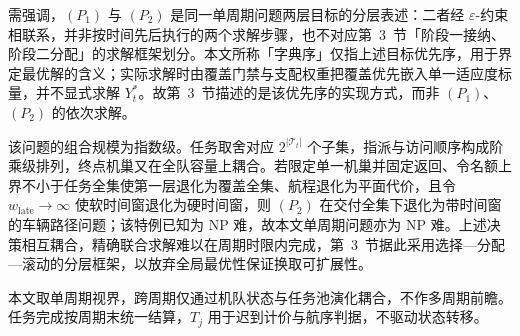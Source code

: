 需强调，$(P_1)$ 与 $(P_2)$ 是同一单周期问题两层目标的分层表述：二者经 $\varepsilon$-约束相联系，并非按时间先后执行的两个求解步骤，也不对应第~3~节「阶段一接纳、阶段二分配」的求解框架划分。本文所称「字典序」仅指上述目标优先序，用于界定最优解的含义；实际求解时由覆盖门禁与支配权重把覆盖优先嵌入单一适应度标量，并不显式求解 $Y_t^*$。故第~3~节描述的是该优先序的实现方式，而非 $(P_1)$、$(P_2)$ 的依次求解。

该问题的组合规模为指数级。任务取舍对应 $2^{|\mathcal{T}_t|}$ 个子集，指派与访问顺序构成阶乘级排列，终点机巢又在全队容量上耦合。若限定单一机巢并固定返回、令名额上界不小于任务全集使第一层退化为覆盖全集、航程退化为平面代价，且令 $w_{\mathrm{late}}\to\infty$ 使软时间窗退化为硬时间窗，则 $(P_2)$ 在交付全集下退化为带时间窗的车辆路径问题；该特例已知为 NP 难，故本文单周期问题亦为 NP 难。上述决策相互耦合，精确联合求解难以在周期时限内完成，第~3~节据此采用选择—分配—滚动的分层框架，以放弃全局最优性保证换取可扩展性。

本文取单周期视界，跨周期仅通过机队状态与任务池演化耦合，不作多周期前瞻。任务完成按周期末统一结算，$T_j$ 用于迟到计价与航序判据，不驱动状态转移。

